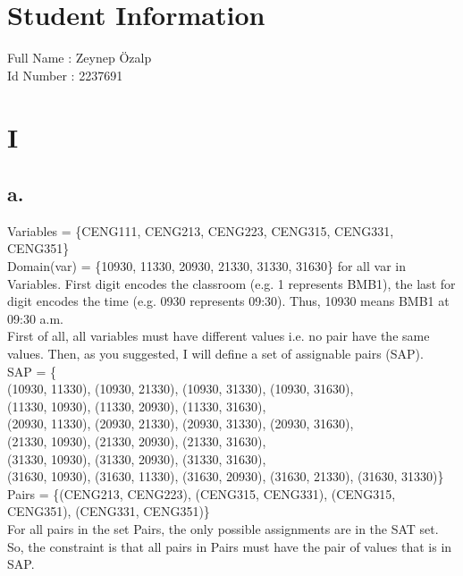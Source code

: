 \documentclass[12pt]{article}
\begin{document}
\section*{Student Information } 
Full Name : Zeynep Özalp \\
Id Number : 2237691 \\

\section*{I}
\subsection*{a.}
Variables = \{CENG111, CENG213, CENG223, CENG315, CENG331, CENG351\} \\

Domain(var) = \{10930, 11330, 20930, 21330, 31330, 31630\} for all var in Variables. First digit encodes the classroom (e.g. 1 represents BMB1), the last for digit encodes the time (e.g. 0930 represents 09:30). Thus, 10930 means BMB1 at 09:30 a.m. \\

First of all, all variables must have different values i.e. no pair have the same values. Then, as you suggested, I will define a set of assignable pairs (SAP).\\
SAP = \{ \\
		(10930, 11330),
		(10930, 21330),
		(10930, 31330),
		(10930, 31630), \\
		(11330, 10930),
		(11330, 20930),
		(11330, 31630), \\
		(20930, 11330),
		(20930, 21330),
		(20930, 31330),
		(20930, 31630), \\
		(21330, 10930),
		(21330, 20930),
		(21330, 31630), \\
		(31330, 10930),
		(31330, 20930),
		(31330, 31630), \\
		(31630, 10930),
		(31630, 11330),
		(31630, 20930),
		(31630, 21330),
		(31630, 31330)\}\\
		
Pairs = \{(CENG213, CENG223), (CENG315, CENG331), (CENG315, CENG351), (CENG331, CENG351)\}\\

For all pairs in the set Pairs, the only possible assignments are in the SAT set. So, the constraint is that all pairs in Pairs must have the pair of values that is in SAP.
\end{document}
